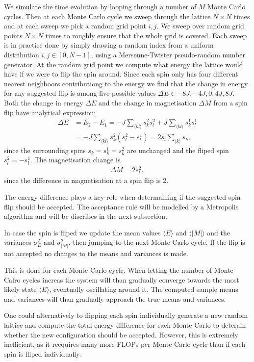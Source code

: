 \documentclass[twocolumn]{aastex62}
\begin{document}
We simulate the time evolution by looping through a number of $M$ Monte Carlo
cycles. Then at each Monte Carlo cycle we sweep through the lattice $N\times N$
times and at each sweep we pick a random grid point $i, j$. We sweep over random
grid points $N\times N$ times to roughly ensure that the whole grid is covered.
Each sweep is in practice done by
simply drawing a random index from a uniform distribution $i,j\in[0, N-1]$,
using a Mersenne-Twister pseudo-random number generator. At the random grid
point we compute what energy the lattice would have if we were to flip the spin
around. Since each spin only has four different nearest neighboors contributiong
to
the energy we find that the change in energy for any suggested flip is among
five possible values $\Delta E \in {-8J, -4J, 0, 4J, 8J}$. Both the change in
energy $\Delta E$ and the change in magnetisation $\Delta M$ from a spin flip have analytical
expression;
\begin{align}
	\Delta E &= E_2 - E_1 = -J\sum_{\langle kl\rangle}s_k^2s_l^2 + J\sum_{\langle kl\rangle}s_k^1s_l^1 \\
	&= -J\sum_{\langle kl\rangle}s_k^2(s_l^2-s_l^1) = 2s_l\sum_{\langle k\rangle} s_k,
\end{align}
since the surrounding spins $s_k = s_k^1 = s_k^2$ are unchanged and the fliped
spin $s_l^2 = -s_l^1$. The magnetisation change is 
\begin{align}
	\Delta M = 2s_l^2,
\end{align}
since the difference in magnetisation at a spin flip is 2. 

The energy difference plays a key role when determaining if the suggested spin
flip should be accepted. The acceptance rule will be modelled by a Metropolis
algorithm and will be discribes in the next subsection. 

In case the spin is fliped we update the mean values $\langle E \rangle$ and
$\langle |M| \rangle$ and the variances $\sigma_E^2$ and $\sigma_{|M|}^2$, then
jumping to the next Monte Carlo cycle. If the flip is not accepted no changes to
the means and variances is made.

This is done for each Monte Carlo cycle. When letting the number of Monte Calro
cycles increas the system will than gradually converge towards the most likely
state $\langle E \rangle$, eventually oscillating around it. The computed sample
means and variances will than gradually approach the true means and variances.

One could alternatively to flipping each spin individually generate a new random
lattice and compute the total energy difference for each Monte Carlo to deterain whether
the new configuration should be accepted. However, this is extremely
inefficient, as it reequires many more FLOPs per Monte Carlo cycle than if each
spin is fliped individually.
\end{document}

